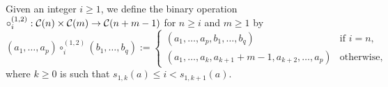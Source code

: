 Given an integer $i \geq 1$, we define the binary operation
\begin{math}
    \circ_i^{(1,2)} : \mathcal{C}(n) \times \mathcal{C}(m)
    \to\mathcal{C}(n + m - 1)
\end{math}
for $n \geq i$ and $m \geq 1$ by
\begin{equation}
    \left(a_1, \dots, a_p\right) \circ_i^{(1,2)}
    \left(b_1, \dots, b_{q}\right)
    :=
    \begin{cases}
        \left(a_1, \dots ,a_{p}, b_1, \dots ,b_{q}\right) &
        \mbox{if } i = n, \\
        \left(a_1, \dots, a_{k}, a_{k+1} + m - 1, a_{k + 2}, \dots,
            a_p\right)
            & \mbox{otherwise},
    \end{cases}
\end{equation}
where $k \geq 0$ is such that $s_{1, k}(a) \leq i < s_{1, k + 1}(a)$.
\medbreak

